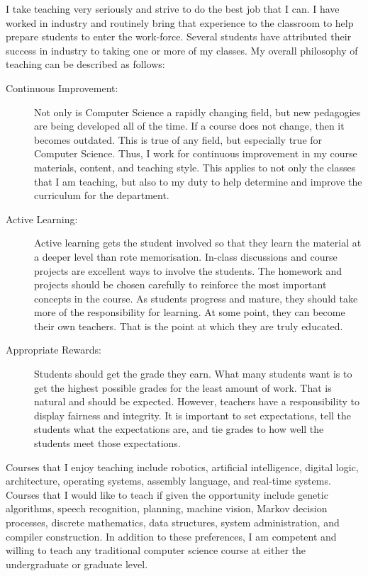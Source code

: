 
I take teaching very seriously and strive to do the best job that I can.  I
have worked in industry and routinely bring that experience to the
classroom to help prepare students to enter the work-force. Several students
have attributed their success in industry to taking one or more of my
classes.  My overall philosophy of teaching can be described as follows:

\begin{description}

  \item[Continuous Improvement:] Not only is Computer Science a rapidly
  changing field, but new  pedagogies are being developed all of
  the time. If a course does not change, then it becomes outdated. This is
  true of any field, but especially true for Computer Science. Thus, I work
  for continuous improvement in my course materials, content, and teaching
  style.  This applies to not only the classes that I am teaching, but also
  to my duty to help determine and improve the curriculum for the
  department.

  \item[Active Learning:] Active learning gets the student involved so that
  they learn the material at a deeper level than rote memorisation.
  In-class discussions and course projects are excellent ways to involve
  the students.  The homework and projects should be chosen carefully to
  reinforce the most important concepts in the course.  As students
  progress and mature, they should take more of the responsibility for
  learning. At some point, they can become their own teachers.  That
  is the point at which they are truly educated.

  \item[Appropriate Rewards:] Students should get the grade they earn.
  What many students want is to get the highest possible grades for the
  least amount of work. That is natural and should be expected.  However,
  teachers have a responsibility to display fairness and integrity.  It is
  important to set expectations, tell the students what the expectations
  are, and tie grades to how well the students meet those expectations.

\end{description}

Courses that I enjoy teaching include robotics, artificial intelligence,
digital logic, architecture, operating systems, assembly language, and
real-time systems.   Courses that I would like to teach if
given the opportunity include genetic algorithms,
speech recognition, planning, machine vision, 
Markov decision processes, discrete mathematics, data structures, system
administration, and compiler construction.  In addition to these
preferences, I am competent and willing to teach any traditional computer
science course at either the undergraduate or graduate level.


